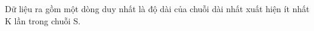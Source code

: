 Dữ liệu ra gồm một dòng duy nhất là độ dài của chuỗi dài nhất xuất hiện ít nhất K lần trong chuỗi S.  

\